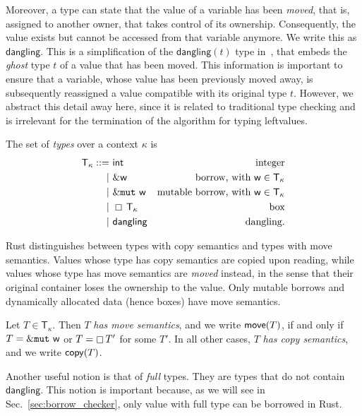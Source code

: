 Moreover, a type can state that the value of a variable
has been \emph{moved}, that is, assigned
to another owner, that takes control of its ownership.
Consequently, the value exists but cannot be accessed from that variable anymore.
We write this as $\mathsf{dangling}$. This is a simplification of the
$\mathsf{dangling}(t)$ type in~\cite{Pearce21}, that embeds
the \emph{ghost} type $t$ of a value that has been moved.
This information is important to ensure that a variable, whose value has been
previously moved away, is subsequently reassigned a value compatible
with its original type $t$. However, we abstract this detail away here,
since it is related to traditional type checking and is irrelevant for
the termination of the algorithm for typing leftvalues.

\begin{definition}[Types]
  The set of \emph{types} over a context $\kappa$ is
  \begin{align*}
    \mathsf{T}_\kappa ::=&\ \mathsf{int} & \text{integer}\\
    | &\ \&\mathsf{w} & \text{borrow, with $\mathsf{w}\in\mathsf{T}_\kappa$}\\
    | &\ \&\mathtt{mut}\ \mathsf{w} & \text{mutable borrow, with $\mathsf{w}\in\mathsf{T}_\kappa$}\\
    | &\ \boxempty\,{\mathsf{T}_\kappa} & \text{box}\\
    | &\ \mathsf{dangling} & \text{dangling}.
  \end{align*}
\end{definition}

Rust distinguishes between types with copy semantics
and types with move semantics.
Values whose type has copy semantics
are copied upon reading, while values whose type has
move semantics are \emph{moved} instead, in the sense that their original container
loses the ownership to the value. Only mutable borrows and dynamically
allocated data (hence boxes) have move semantics.

\begin{definition}\label{def:copy_move}
  Let $T\in\mathsf{T}_\kappa$. Then $T$ \emph{has move semantics}, and we write
  $\mathsf{move}(T)$, if and only if $T=\&\mathtt{mut}\ \mathsf{w}$ or
  $T=\boxempty\,{T'}$ for some $T'$. In all other cases, $T$ \emph{has copy semantics},
  and we write $\mathsf{copy}(T)$.
\end{definition}

Another useful notion is that of \emph{full} types. They are types that do not contain
$\mathsf{dangling}$. This notion is important because, as we will see
in Sec.~\ref{sec:borrow_checker}, only value with full type can be borrowed in Rust.

